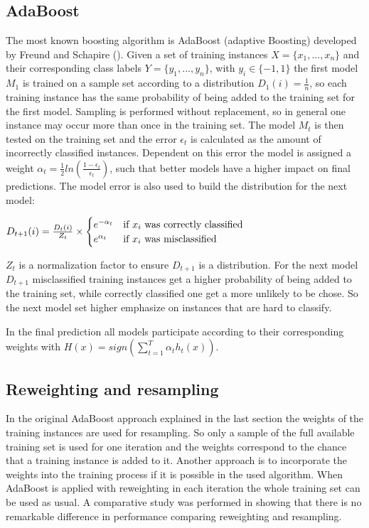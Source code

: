 \documentclass[10pt]{reportMaster}
\begin{document}
\subsection{AdaBoost}
\label{sec:adaBoost}
The most known boosting algorithm is AdaBoost (adaptive Boosting) developed by Freund and Schapire (\cite{boostingIntro}).
Given a set of training instances $X = \{x_1, ..., x_n\}$ and their corresponding class labels $Y = \{y_1, ..., y_n\}$, with $y_i \in \{-1, 1\}$ the first model $M_1$ is trained on a sample set according to a distribution $D_1(i) = \frac{1}{n}$, so each training instance has the same probability of being added to the training set for the first model.
Sampling is performed without replacement, so in general one instance may occur more than once in the training set.
The model $M_t$ is then tested on the training set and the error $\epsilon_t$ is calculated as the amount of incorrectly classified instances.
Dependent on this error the model is assigned a weight $\alpha_t = \frac{1}{2} ln(\frac{1 - \epsilon_t}{\epsilon_t})$, such that better models have a higher impact on final predictions.
The model error is also used to build the distribution for the next model: 

$ D_{t+1}(i) = \frac{D_t(i)}{Z_t} \times 
\begin{cases}
	e^{-\alpha_t} & \text{if $ x_i $ was correctly classified} \\ 
	e^{\alpha_t} & \text{if $ x_i $ was misclassified}
\end{cases}
$

$Z_t$ is a normalization factor to ensure $D_{t+1}$ is a distribution.
For the next model $D_{t+1}$ misclassified training instances get a higher probability of being added to the training set, while correctly classified one get a more unlikely to be chose.
So the next model set higher emphasize on instances that are hard to classify.

In the final prediction all models participate according to their corresponding weights with $H(x) = sign(\sum_{t = 1}^T\alpha_th_t(x))$.


\subsection{Reweighting and resampling}
\label{sec:reweightingResampling}
In the original AdaBoost approach explained in the last section the weights of the training instances are used for resampling.
So only a sample of the full available training set is used for one iteration and the weights correspond to the chance that a training instance is added to it.
Another approach is to incorporate the weights into the training process if it is possible in the used algorithm.
When AdaBoost is applied with reweighting in each iteration the whole training set can be used as usual.
A comparative study was performed in \cite{resamplingReweighting} showing that there is no remarkable difference in performance comparing reweighting and resampling.
\end{document}
